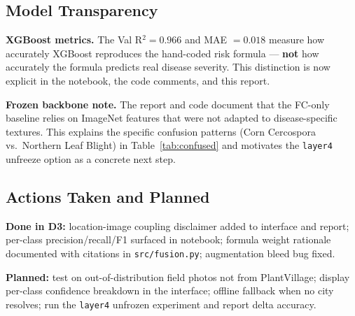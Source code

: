 \documentclass[conference]{IEEEtran}
\let\oldtexttt\texttt
\renewcommand{\texttt}[1]{{\small\oldtexttt{#1}}}
\begin{document}
\subsection{Model Transparency}

\textbf{XGBoost metrics.} The Val R$^2 = 0.966$ and MAE $= 0.018$ measure how accurately XGBoost reproduces the hand-coded risk formula --- \textbf{not} how accurately the formula predicts real disease severity. This distinction is now explicit in the notebook, the code comments, and this report.

\textbf{Frozen backbone note.} The report and code document that the FC-only baseline relies on ImageNet features that were not adapted to disease-specific textures. This explains the specific confusion patterns (Corn Cercospora vs.\ Northern Leaf Blight) in Table~\ref{tab:confused} and motivates the \texttt{layer4} unfreeze option as a concrete next step.

\subsection{Actions Taken and Planned}

\textbf{Done in D3:} location-image coupling disclaimer added to interface and report; per-class precision/recall/F1 surfaced in notebook; formula weight rationale documented with citations in \texttt{src/fusion.py}; augmentation bleed bug fixed.

\textbf{Planned:} test on out-of-distribution field photos not from PlantVillage; display per-class confidence breakdown in the interface; offline fallback when no city resolves; run the \texttt{layer4} unfrozen experiment and report delta accuracy.
\end{document}
